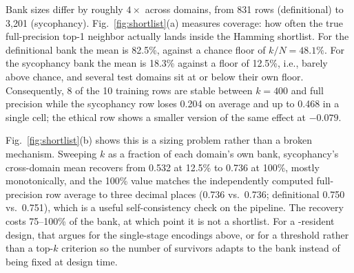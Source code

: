 Bank sizes differ by roughly $4\times$ across domains, from 831 rows
(definitional) to 3{,}201 (sycophancy). Fig.~\ref{fig:shortlist}(a)
measures coverage: how often the true full-precision top-1 neighbor
actually lands inside the Hamming shortlist. For the definitional bank
the mean is 82.5\%, against a chance floor of $k/N = 48.1\%$. For the
sycophancy bank the mean is 18.3\% against a floor of 12.5\%, i.e.,
barely above chance, and several test domains sit at or below their own
floor. Consequently, 8 of the 10 training rows are stable between $k=400$
and full precision while the sycophancy row loses 0.204 \auroc on
average and up to 0.468 in a single cell; the ethical row shows a smaller
version of the same effect at $-0.079$.

Fig.~\ref{fig:shortlist}(b) shows this is a sizing problem rather than a
broken mechanism. Sweeping $k$ as a fraction of each domain's own bank,
sycophancy's cross-domain mean recovers from 0.532 at 12.5\% to 0.736 at
100\%, mostly monotonically, and the 100\% value matches the
independently computed full-precision row average to three decimal places
(0.736 vs.\ 0.736; definitional 0.750 vs.\ 0.751), which is a useful
self-consistency check on the pipeline. The recovery costs 75--100\% of
the bank, at which point it is not a shortlist. For a \cam-resident
design, that argues for the single-stage encodings above, or for a
threshold rather than a top-$k$ criterion so the number of survivors
adapts to the bank instead of being fixed at design time.

